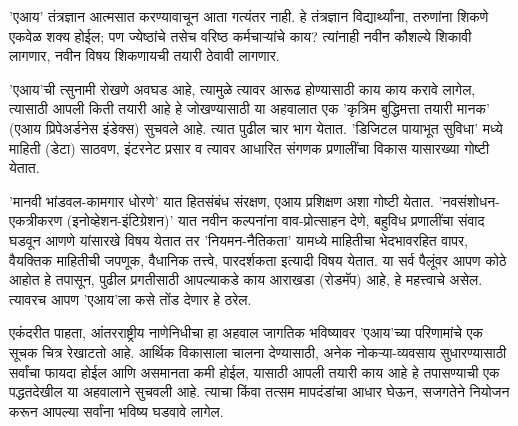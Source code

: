 'एआय' तंत्रज्ञान आत्मसात करण्यावाचून आता गत्यंतर नाही. हे तंत्रज्ञान विद्यार्थ्यांना, तरुणांना शिकणे एकवेळ शक्य होईल; पण ज्येष्ठांचे तसेच वरिष्ठ कर्मचाऱ्यांचे काय? त्यांनाही नवीन कौशल्ये शिकावी लागणार, नवीन विषय शिकणायची तयारी ठेवावी लागणार.

'एआय'ची त्सुनामी रोखणे अवघड आहे, त्यामुळे त्यावर आरूढ होण्यासाठी काय काय करावे लागेल, त्यासाठी आपली किती तयारी आहे हे जोखण्यासाठी या अहवालात एक 'कृत्रिम बुद्धिमत्ता तयारी मानक' (एआय प्रिपेअर्डनेस इंडेक्स) सुचवले आहे. त्यात पुढील चार भाग येतात. 'डिजिटल पायाभूत सुविधा' मध्ये माहिती (डेटा) साठवण, इंटरनेट प्रसार व त्यावर आधारित संगणक प्रणालींचा विकास यासारख्या गोष्टी येतात.

'मानवी भांडवल-कामगार धोरणे' यात हितसंबंध संरक्षण, एआय प्रशिक्षण अशा गोष्टी येतात. 'नवसंशोधन-एकत्रीकरण (इनोव्हेशन-इंटिग्रेशन)' यात नवीन कल्पनांना वाव-प्रोत्साहन देणे, बहुविध प्रणालींचा संवाद घडवून आणणे यांसारखे विषय येतात तर 'नियमन-नैतिकता' यामध्ये माहितीचा भेदभावरहित वापर, वैयक्तिक माहितीची जपणूक, वैधानिक तत्त्वे, पारदर्शकता इत्यादी विषय येतात. या सर्व पैलूंवर आपण कोठे आहोत हे तपासून, पुढील प्रगतीसाठी आपल्याकडे काय आराखडा (रोडमॅप) आहे, हे महत्त्वाचे असेल. त्यावरच आपण 'एआय'ला कसे तोंड देणार हे ठरेल.

एकंदरीत पाहता, आंतरराष्ट्रीय नाणेनिधीचा हा अहवाल जागतिक भविष्यावर 'एआय'च्या परिणामांचे एक सूचक चित्र रेखाटतो आहे. आर्थिक विकासाला चालना देण्यासाठी, अनेक नोकऱ्या-व्यवसाय सुधारण्यासाठी सर्वांचा फायदा होईल आणि असमानता कमी होईल, यासाठी आपली तयारी काय आहे हे तपासण्याची एक पद्धतदेखील या अहवालाने सुचवली आहे. त्याचा किंवा तत्सम मापदंडांचा आधार घेऊन, सजगतेने नियोजन करून आपल्या सर्वांना भविष्य घडवावे लागेल.

